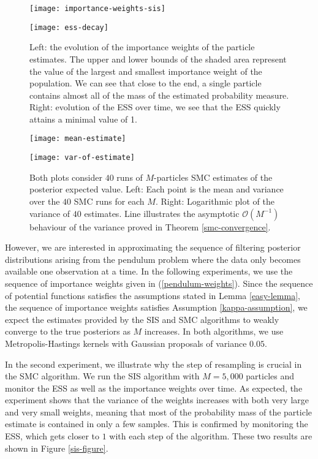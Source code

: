 \begin{figure}[htbp]
  \begin{minipage}{.5\textwidth}
    \texttt{[image: importance-weights-sis]}
  \end{minipage}
  \begin{minipage}{.5\textwidth}
    \texttt{[image: ess-decay]}
  \end{minipage}
  \caption{Left: the evolution of the importance weights of the particle estimates. The upper and lower bounds of the shaded area represent the value of the largest and smallest importance weight of the population. We can see that close to the end, a single particle contains almost all of the mass of the estimated probability measure. Right: evolution of the ESS over time, we see that the ESS quickly attains a minimal value of 1.}\label{sis-figure}

  \bigskip

  \begin{minipage}{.5\textwidth}
    \texttt{[image: mean-estimate]}
  \end{minipage}
  \begin{minipage}{.5\textwidth}
    \texttt{[image: var-of-estimate]}
  \end{minipage}
  \caption{Both plots consider $40$ runs of $M$-particles SMC estimates of the posterior expected value. Left: Each point is the mean and variance over the $40$ SMC runs for each $M$. Right: Logarithmic plot of the variance of $40$ estimates. Line illustrates the asymptotic $\mathcal{O}(M^{-1})$ behaviour of the variance proved in Theorem \ref{smc-convergence}. }
  \label{smc-figure}
\end{figure}

However, we are interested in approximating the sequence of filtering posterior distributions arising from the pendulum problem where the data only becomes available one observation at a time. In the following experiments, we use the sequence of importance weights given in (\ref{pendulum-weights}). Since the sequence of potential functions satisfies the assumptions stated in Lemma \ref{easy-lemma}, the sequence of importance weights satisfies Assumption \ref{kappa-assumption}, we expect the estimates provided by the SIS and SMC algorithms to weakly converge to the true posteriors as $M$ increases. In both algorithms, we use Metropolis-Hastings kernels with Gaussian proposals of variance $0.05$. 

In the second experiment, we illustrate why the step of resampling is crucial in the SMC algorithm. We run the SIS algorithm with $M=5,000$ particles and monitor the ESS as well as the importance weights over time. As expected, the experiment shows that the variance of the weights increases with both very large and very small weights, meaning that most of the probability mass of the particle estimate is contained in only a few samples. This is confirmed by monitoring the ESS, which gets closer to $1$ with each step of the algorithm. These two results are shown in Figure \ref{sis-figure}.

